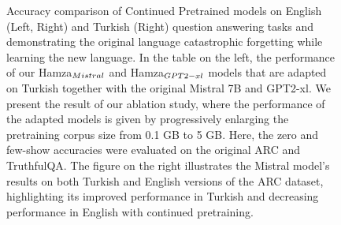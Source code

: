 \documentclass{article}
\begin{document}
\begin{figure}[h]
    \centering
    \caption{Accuracy comparison of Continued Pretrained models on English (Left, Right) and Turkish (Right) question answering tasks and demonstrating the original language catastrophic forgetting while learning the new language. In the table on the left, the performance of our Hamza$_{\scriptsize Mistral}$ and Hamza$_{\scriptsize GPT2-xl}$ models that are adapted on Turkish together with the original Mistral 7B and GPT2-xl. We present the result of our ablation study, where the performance of the adapted models is given by progressively enlarging the pretraining corpus size from 0.1 GB to 5 GB. Here, the zero and few-show accuracies were evaluated on the original ARC and TruthfulQA. The figure on the right illustrates the Mistral model's results on both Turkish and English versions of the ARC dataset, highlighting its improved performance in Turkish and decreasing performance in English with continued pretraining.}
    \label{fig:arc_scores}
\end{figure}
\end{document}
